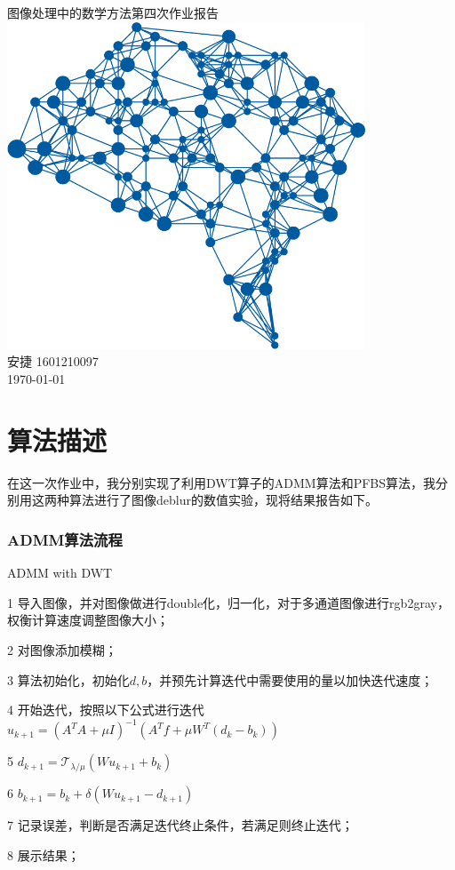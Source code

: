 \documentclass[a4paper, UTF8]{ctexrep}
\begin{document}
	\begin{titlepage}
		\centering
		\vspace{6cm}
		\LARGE{图像处理中的数学方法第四次作业报告}\\
		\vspace{3cm}
		\includegraphics[width=0.8\textwidth]{deepLearning.png}\\
		\vspace{4cm}
		\normalsize{安捷 1601210097}\\
		\normalsize{\today}
	\end{titlepage}
	\section{算法描述}
		在这一次作业中，我分别实现了利用DWT算子的ADMM算法和PFBS算法，我分别用这两种算法进行了图像deblur的数值实验，现将结果报告如下。
		\subsubsection{ADMM算法流程} %
			\begin{algorithm}
				\caption{ADMM with DWT}
				\begin{algorithmic}
					\item[1] 导入图像，并对图像做进行double化，归一化，对于多通道图像进行rgb2gray，权衡计算速度调整图像大小；
					\item[2] 对图像添加模糊；
					\item[3] 算法初始化，初始化$d, b$，并预先计算迭代中需要使用的量以加快迭代速度；
					\item[4] 开始迭代，按照以下公式进行迭代$u_{k+1} = \left( A^T A + \mu I \right)^{-1} \left( A^T f + \mu W^T \left( d_k - b_k \right) \right)$
					\item[5] $d_{k+1} = \mathcal{T}_{\lambda / \mu}\left( Wu_{k+1} + b_k \right) $
					\item[6] $b_{k+1} = b_k + \delta \left( Wu_{k+1} - d_{k+1} \right)$
					\item[7] 记录误差，判断是否满足迭代终止条件，若满足则终止迭代；
					\item[8] 展示结果；
				\end{algorithmic}
			\end{algorithm}
\end{document}
